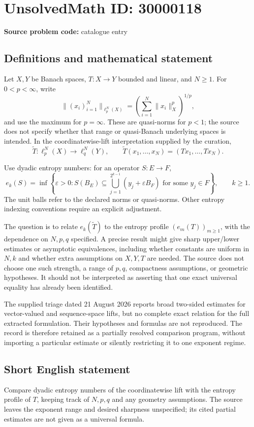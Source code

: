 \documentclass[11pt]{article}
\begin{document}
\section*{UnsolvedMath ID: 30000118}
\textbf{Source problem code:} catalogue entry
\subsection{Definitions and mathematical statement}
Let \(X,Y\) be Banach spaces, \(T:X\to Y\) bounded and linear, and \(N\geq1\). For \(0<p<\infty\), write
\[
 \|(x_i)_{i=1}^N\|_{\ell_p^N(X)}
 =\left(\sum_{i=1}^N\|x_i\|_X^p\right)^{1/p},
\]
and use the maximum for \(p=\infty\). These are quasi-norms for \(p<1\); the source does not specify whether that range or quasi-Banach underlying spaces is intended. In the coordinatewise-lift interpretation supplied by the curation,
\[
 \widetilde T:\ell_p^N(X)\to\ell_q^N(Y),\qquad
 \widetilde T(x_1,\ldots,x_N)=(Tx_1,\ldots,Tx_N).
\]

Use dyadic entropy numbers: for an operator \(S:E\to F\),
\[
 e_k(S)=\inf\left\{\varepsilon>0:S(B_E)\subseteq
 \bigcup_{j=1}^{2^{k-1}}(y_j+\varepsilon B_F)
 \text{ for some }y_j\in F\right\},\qquad k\geq1.
\]
The unit balls refer to the declared norms or quasi-norms. Other entropy indexing conventions require an explicit adjustment.

The question is to relate \(e_k(\widetilde T)\) to the entropy profile \((e_m(T))_{m\geq1}\), with the dependence on \(N,p,q\) specified. A precise result might give sharp upper/lower estimates or asymptotic equivalences, including whether constants are uniform in \(N,k\) and whether extra assumptions on \(X,Y,T\) are needed. The source does not choose one such strength, a range of \(p,q\), compactness assumptions, or geometric hypotheses. It should not be interpreted as asserting that one exact universal equality has already been identified.

The supplied triage dated 21 August 2026 reports broad two-sided estimates for vector-valued and sequence-space lifts, but no complete exact relation for the full extracted formulation. Their hypotheses and formulas are not reproduced. The record is therefore retained as a partially resolved comparison program, without importing a particular estimate or silently restricting it to one exponent regime.
\subsection{Short English statement}
Compare dyadic entropy numbers of the coordinatewise lift with the entropy profile of \(T\), keeping track of \(N,p,q\) and any geometry assumptions. The source leaves the exponent range and desired sharpness unspecified; its cited partial estimates are not given as a universal formula.
\end{document}
